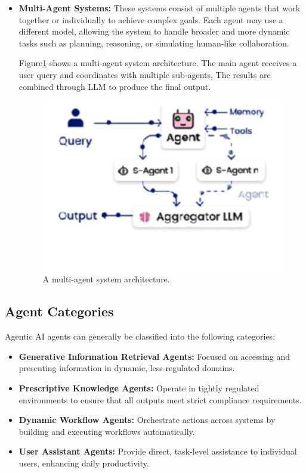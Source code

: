 \begin{itemize}
\begin{itemize}
		\item \textbf{Multi-Agent Systems:} These systems consist of multiple agents that work together or individually to achieve complex goals. Each agent may use a different model, allowing the system to handle broader and more dynamic tasks such as planning, reasoning, or simulating human-like collaboration.
		
		Figure\ref{multi_agent} shows a multi-agent system architecture. The main agent receives a user query and coordinates with multiple  sub-agents,  The results  are combined through LLM to produce the final output.
		\begin{figure}[H]
		\centering
		\includegraphics[width=0.6\linewidth]{Figures/multiagent.png}
		\caption{
			A multi-agent system architecture. 
		}
		\label{multi_agent}
	\end{figure}
		
	\end{itemize}
	
\end{itemize}

\subsection{ Agent Categories}
Agentic AI agents can generally be classified into the following categories\citep{aisera2024agentic}:

\begin{itemize}
	\item \textbf{Generative Information Retrieval Agents:} Focused on accessing and presenting information in dynamic, less-regulated domains.
	\item \textbf{Prescriptive Knowledge Agents:} Operate in tightly regulated environments to ensure that all outputs meet strict compliance requirements.
	\item \textbf{Dynamic Workflow Agents:} Orchestrate actions across systems by building and executing workflows automatically.
	\item \textbf{User Assistant Agents:} Provide direct, task-level assistance to individual users, enhancing daily productivity.
\end{itemize}

